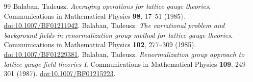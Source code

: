 \documentclass[10pt]{article}
\begin{document}
\begin{thebibliography}{99}
 Balaban, Tadeusz. \emph{Averaging operations for lattice gauge theories}. Communications in Mathematical Physics \textbf{98}, 17--51 (1985). \href{https://doi.org/10.1007/BF01211042}{doi:10.1007/BF01211042}.
 Balaban, Tadeusz. \emph{The variational problem and background fields in renormalization group method for lattice gauge theories}. Communications in Mathematical Physics \textbf{102}, 277--309 (1985). \href{https://doi.org/10.1007/BF01229381}{doi:10.1007/BF01229381}.
 Balaban, Tadeusz. \emph{Renormalization group approach to lattice gauge field theories I}. Communications in Mathematical Physics \textbf{109}, 249--301 (1987). \href{https://doi.org/10.1007/BF01215223}{doi:10.1007/BF01215223}.
\end{thebibliography}
\end{document}
